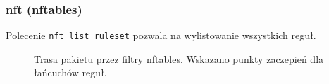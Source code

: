 % 
% 
% 
% 

\subsubsection{nft (nftables)}

Polecenie \Verb#nft list ruleset# pozwala na wylistowanie wszystkich reguł.

\begin{figure}[h!]\begin{center}\begin{adjustbox}{scale=.9}
\end{adjustbox}\end{center}
\caption{Trasa pakietu przez filtry nftables. Wskazano punkty zaczepień dla łańcuchów reguł.}
\end{figure}

